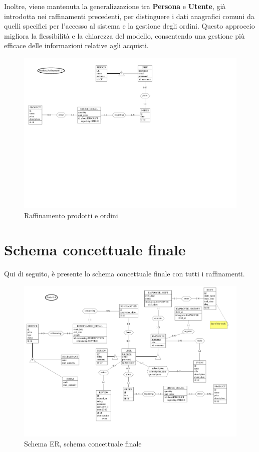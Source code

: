 \documentclass[a4paper,12pt]{report}
\begin{document}
\vspace{\baselineskip}
Inoltre, viene mantenuta la generalizzazione tra \textbf{Persona} e \textbf{Utente}, già 
introdotta nei raffinamenti precedenti, per distinguere i dati anagrafici comuni da quelli 
specifici per l'accesso al sistema e la gestione degli ordini. Questo approccio migliora la 
flessibilità e la chiarezza del modello, consentendo una gestione più efficace
delle informazioni relative agli acquisti.
\begin{figure}[H]
	\centering
	\includegraphics[width=\textwidth, trim=0 300pt 325pt 0, clip]{./schemas/refinements/product.pdf}
	\caption{Raffinamento prodotti e ordini}
	\label{fig:raffinamento-prodotto-ordini}
\end{figure}

\newpage
\section{Schema concettuale finale}
Qui di seguito, è presente lo schema concettuale finale con tutti i raffinamenti.

\begin{figure}[H]
    \centering
    \includegraphics[width=\textwidth, trim=0 0 0 0]{./schemas/refinements/final.pdf}
    \caption{Schema ER, schema concettuale finale}
    \label{fig:schema-finale}
\end{figure}
\newpage
\end{document}
